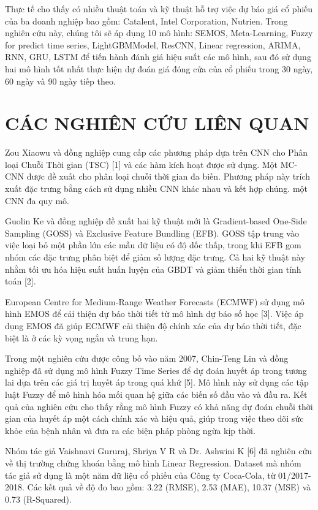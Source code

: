 \documentclass[conference]{IEEEtran}
\begin{document}
Thực tế cho thấy có nhiều thuật toán và kỹ thuật hỗ trợ việc dự báo giá cổ phiếu của ba doanh nghiệp bao gồm: Catalent, Intel Corporation, Nutrien. Trong nghiên cứu này, chúng tôi sẽ áp dụng 10 mô hình: SEMOS, Meta-Learning, Fuzzy for predict time series, LightGBMModel, ResCNN, Linear regression, ARIMA, RNN, GRU, LSTM để tiến hành đánh giá hiệu suất các mô hình, sau đó sử dụng hai mô hình tốt nhất thực hiện dự đoán giá đóng cửa của cổ phiếu trong 30 ngày, 60 ngày và 90 ngày tiếp theo. 

\section{CÁC NGHIÊN CỨU LIÊN QUAN}
Zou Xiaowu và đồng nghiệp cung cấp các phương pháp dựa trên CNN cho Phân loại Chuỗi Thời gian (TSC) [1] và các hàm kích hoạt được sử dụng. Một MC-CNN được đề xuất cho phân loại chuỗi thời gian đa biến. Phương pháp này trích xuất đặc trưng bằng cách sử dụng nhiều CNN khác nhau và kết hợp chúng. một CNN đa quy mô.

Guolin Ke và đồng nghiệp đề xuất hai kỹ thuật mới là Gradient-based One-Side Sampling (GOSS) và Exclusive Feature Bundling (EFB). GOSS tập trung vào việc loại bỏ một phần lớn các mẫu dữ liệu có độ dốc thấp, trong khi EFB gom nhóm các đặc trưng phân biệt để giảm số lượng đặc trưng. Cả hai kỹ thuật này nhằm tối ưu hóa hiệu suất huấn luyện của GBDT và giảm thiểu thời gian tính toán [2].

European Centre for Medium-Range Weather Forecasts (ECMWF) sử dụng mô hình EMOS để cải thiện dự báo thời tiết từ mô hình dự báo số học [3]. Việc áp dụng EMOS đã giúp ECMWF cải thiện độ chính xác của dự báo thời tiết, đặc biệt là ở các kỳ vọng ngắn và trung hạn.

Trong một nghiên cứu được công bố vào năm 2007, Chin-Teng Lin và đồng nghiệp đã sử dụng mô hình Fuzzy Time Series để dự đoán huyết áp trong tương lai dựa trên các giá trị huyết áp trong quá khứ [5]. Mô hình này sử dụng các tập luật Fuzzy để mô hình hóa mối quan hệ giữa các biến số đầu vào và đầu ra. Kết quả của nghiên cứu cho thấy rằng mô hình Fuzzy có khả năng dự đoán chuỗi thời gian của huyết áp một cách chính xác và hiệu quả, giúp trong việc theo dõi sức khỏe của bệnh nhân và đưa ra các biện pháp phòng ngừa kịp thời.

Nhóm tác giả Vaishnavi Gururaj, Shriya V R và Dr. Ashwini K [6] đã nghiên cứu về thị trường chứng khoán bằng mô hình Linear Regression. Dataset mà nhóm tác giả sử dụng là một năm dữ liệu cổ phiếu của Công ty Coca-Cola, từ 01/2017-2018. Các kết quả về độ đo bao gồm: 3.22 (RMSE), 2.53 (MAE), 10.37 (MSE) và 0.73 (R-Squared).
\end{document}

